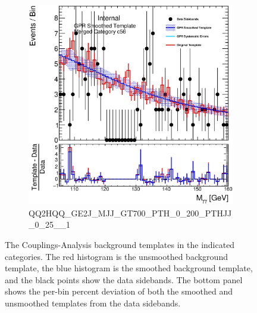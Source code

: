 \begin{figure}
\begin{center}
\begin{subfigure}[T]{0.49\linewidth}
	\centering
	\includegraphics[width=\linewidth]{figures/background/gpr/coupCatTemplates/GPR_Smoothed_Plot_hmgg_c56.eps}
	\caption{\tiny{QQ2HQQ\_GE2J\_MJJ\_GT700\_PTH\_0\_200\_PTHJJ\_0\_25\_\_1}}
\end{subfigure}
\caption{The Couplings-Analysis background templates in the indicated categories. The red histogram is the unsmoothed background template, the blue histogram is the smoothed background template, and the black points show the data sidebands. The bottom panel shows the per-bin percent deviation of both the smoothed and unsmoothed templates from the data sidebands. }
 \label{fig:gpr_coupcat_14}
 \end{center}
\end{figure}

